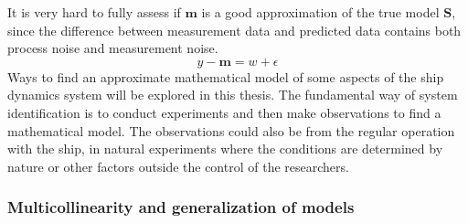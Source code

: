 It is very hard to fully assess if $\mathbf{m}$ is a good approximation of the true model $\mathbf{S}$, since the difference between measurement data and predicted data contains both process noise and measurement noise.
$$
y - \mathbf{m} = w + \epsilon
$$
Ways to find an approximate mathematical model of some aspects of the ship dynamics system will be explored in this thesis. The fundamental way of system identification is to conduct experiments and then make observations to find a mathematical model. 
The observations could also be from the regular operation with the ship, in natural experiments where the conditions are determined by nature or other factors outside the control of the researchers.

\subsubsection{Multicollinearity and generalization of models} \label{sec:multicollinearity}

